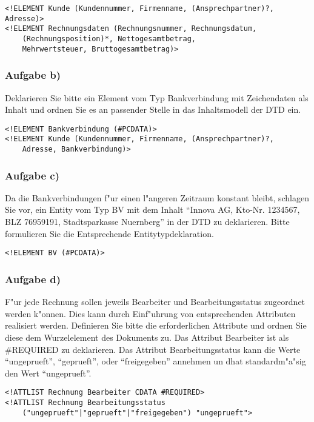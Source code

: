 \lstset{language=XML}
\begin{lstlisting}
<!ELEMENT Kunde (Kundennummer, Firmenname, (Ansprechpartner)?, Adresse)>
<!ELEMENT Rechnungsdaten (Rechnungsnummer, Rechnungsdatum,
    (Rechnungsposition)*, Nettogesamtbetrag,
    Mehrwertsteuer, Bruttogesamtbetrag)>
\end{lstlisting}

\subsubsection{Aufgabe b)}
Deklarieren Sie bitte ein Element vom Typ Bankverbindung mit Zeichendaten als Inhalt und ordnen Sie es an passender Stelle in das Inhaltsmodell der DTD ein.\\
\lstset{language=XML}
\begin{lstlisting}
<!ELEMENT Bankverbindung (#PCDATA)>
<!ELEMENT Kunde (Kundennummer, Firmenname, (Ansprechpartner)?,
    Adresse, Bankverbindung)>
\end{lstlisting}

\subsubsection{Aufgabe c)}
Da die Bankverbindungen f"ur einen l"angeren Zeitraum konstant bleibt, schlagen Sie vor, ein Entity vom Typ BV mit dem Inhalt "`Innova AG, Kto-Nr. 1234567, BLZ 76959191, Stadtsparkasse Nuernberg"' in der DTD zu deklarieren.
Bitte formulieren Sie die Entsprechende Entitytypdeklaration.\\

\lstset{language=XML}
\begin{lstlisting}
<!ELEMENT BV (#PCDATA)>
\end{lstlisting}

\subsubsection{Aufgabe d)}
F"ur jede Rechnung sollen jeweils Bearbeiter und Bearbeitungsstatus zugeordnet werden k"onnen.
Dies kann durch Einf"uhrung von entsprechenden Attributen realisiert werden.
Definieren Sie bitte die erforderlichen Attribute und ordnen Sie diese dem Wurzelelement des Dokuments zu.
Das Attribut Bearbeiter ist als \#REQUIRED zu deklarieren.
Das Attribut Bearbeitungsstatus kann die Werte "`ungeprueft"', "`geprueft"', oder "`freigegeben"' annehmen un dhat standardm"a"sig den Wert "`ungeprueft"'.

\lstset{language=XML}
\begin{lstlisting}
<!ATTLIST Rechnung Bearbeiter CDATA #REQUIRED>
<!ATTLIST Rechnung Bearbeitungsstatus
    ("ungeprueft"|"geprueft"|"freigegeben") "ungeprueft">
\end{lstlisting}

